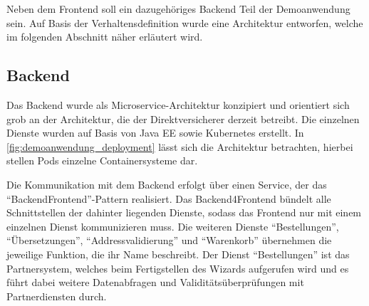 









Neben dem Frontend soll ein dazugehöriges Backend Teil der Demoanwendung sein. Auf Basis der Verhaltensdefinition wurde eine Architektur entworfen, welche im folgenden Abschnitt näher erläutert wird.

\subsection{Backend}
\label{subsec:demoanwendung-backend}

Das Backend wurde als Microservice-Architektur \cite{MicroserviceArchitecture} konzipiert und orientiert sich grob an der Architektur, die der Direktversicherer derzeit betreibt. Die einzelnen Dienste wurden auf Basis von Java EE sowie Kubernetes erstellt. In \autoref{fig:demoanwendung_deployment} lässt sich die Architektur betrachten, hierbei stellen Pods einzelne Containersysteme dar.

Die Kommunikation mit dem Backend erfolgt über einen Service, der das \enquote{Backend\-Frontend}-Pattern realisiert. Das Backend4Frontend bündelt alle Schnittstellen der dahinter liegenden Dienste, sodass das Frontend nur mit einem einzelnen Dienst kommunizieren muss. Die weiteren Dienste \enquote{Bestellungen}, \enquote{Übersetzungen}, \enquote{Addressvalidierung} und \enquote{Warenkorb} übernehmen die jeweilige Funktion, die ihr Name beschreibt. Der Dienst \enquote{Bestellungen} ist das Partnersystem, welches beim Fertigstellen des Wizards aufgerufen wird und es führt dabei weitere Datenabfragen und Validitätsüberprüfungen mit Partnerdiensten durch.

